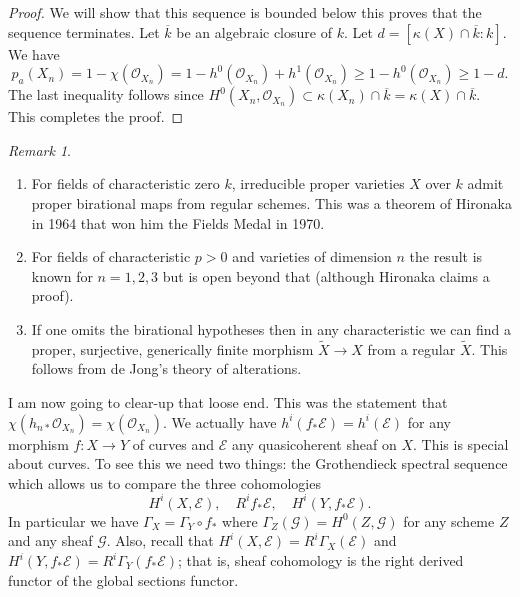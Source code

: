 \documentclass[12pt]{article}
\numberwithin{equation}{section}
\theoremstyle{definition}
\theoremstyle{remark}
\newtheorem{remark}[theorem]{Remark}
\newcommand{\Ocal}{\mathcal{O}}
\newcommand{\Gcal}{\mathcal{G}}
\newcommand{\Ecal}{\mathcal{E}}
\begin{document}
\begin{proof}
	We will show that this sequence is bounded below this proves that the sequence terminates. 
	Let $\overline{k}$ be an algebraic closure of $k$. 
	Let $d = [\kappa(X)\cap \overline{k}:k]$. 
	We have 
	$$p_a(X_n) = 1-\chi(\Ocal_{X_n}) = 1-h^0(\Ocal_{X_n}) + h^1(\Ocal_{X_n}) \geq 1-h^0(\Ocal_{X_n}) \geq 1-d.$$
	The last inequality follows since $H^0(X_n,\Ocal_{X_n}) \subset \kappa(X_n) \cap \overline{k} = \kappa(X) \cap \overline{k}$. 
	This completes the proof. 
\end{proof}

\begin{remark}
	\begin{enumerate}
		\item For fields of characteristic zero $k$, irreducible proper varieties $X$ over $k$ admit proper birational maps from regular schemes. 
		This was a theorem of Hironaka in 1964 that won him the Fields Medal in 1970. 
		\item For fields of characteristic $p> 0$ and varieties of dimension $n$ the result is known for $n=1,2,3$ but is open beyond that (although Hironaka claims a proof).
		\item If one omits the birational hypotheses then in any characteristic we can find a proper, surjective, generically finite morphism $\widetilde{X}\to X$ from a regular $\widetilde{X}$. This follows from de Jong's theory of alterations.   
	\end{enumerate}
\end{remark}

I am now going to clear-up that loose end. 
This was the statement that $\chi(h_{n*}\Ocal_{X_n}) = \chi(\Ocal_{X_n})$. 
We actually have $h^i(f_*\Ecal) = h^i(\Ecal)$ for any morphism $f:X\to Y$ of curves and $\Ecal$ any quasicoherent sheaf on $X$. 
This is special about curves. 
To see this we need two things: the Grothendieck spectral sequence which allows us to compare the three cohomologies 
$$ H^i(X,\Ecal), \quad R^if_*\Ecal, \quad H^i(Y,f_*\Ecal). $$
In particular we have $\Gamma_X = \Gamma_Y\circ f_*$ where $\Gamma_Z(\Gcal) = H^0(Z,\Gcal)$ for any scheme $Z$ and any sheaf $\Gcal$.
Also, recall that $H^i(X,\Ecal) = R^i\Gamma_X(\Ecal)$ and $H^i(Y,f_*\Ecal) = R^i\Gamma_Y(f_*\Ecal)$; that is, sheaf cohomology is the right derived functor of the global sections functor.
\end{document}
